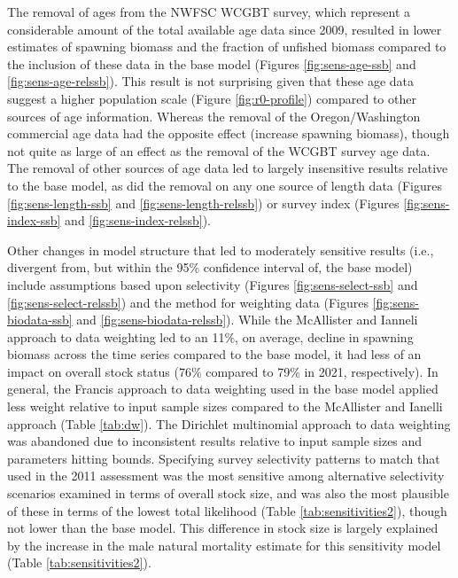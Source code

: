 \documentclass[11pt,
  english,
  a4paper,
]{article}
\begin{document}
\leavevmode\tagmcend\tagstructend\par


The removal of ages from the NWFSC WCGBT survey, which represent a considerable amount of the total available age data since 2009, resulted in lower estimates of spawning biomass and the fraction of unfished biomass compared to the inclusion of these data in the base model (Figures \ref{fig:sens-age-ssb} and \ref{fig:sens-age-relssb}). This result is not surprising given that these age data suggest a higher population scale (Figure \ref{fig:r0-profile}) compared to other sources of age information. Whereas the removal of the Oregon/Washington commercial age data had the opposite effect (increase spawning biomass), though not quite as large of an effect as the removal of the WCGBT survey age data. The removal of other sources of age data led to largely insensitive results relative to the base model, as did the removal on any one source of length data (Figures \ref{fig:sens-length-ssb} and \ref{fig:sens-length-relssb}) or survey index (Figures \ref{fig:sens-index-ssb} and \ref{fig:sens-index-relssb}).

\leavevmode\tagmcend\tagstructend\par


Other changes in model structure that led to moderately sensitive results (i.e., divergent from, but within the 95\% confidence interval of, the base model) include assumptions based upon selectivity (Figures \ref{fig:sens-select-ssb} and \ref{fig:sens-select-relssb}) and the method for weighting data (Figures \ref{fig:sens-biodata-ssb} and \ref{fig:sens-biodata-relssb}). While the McAllister and Ianneli approach to data weighting led to an 11\%, on average, decline in spawning biomass across the time series compared to the base model, it had less of an impact on overall stock status (76\% compared to 79\% in 2021, respectively). In general, the Francis approach to data weighting used in the base model applied less weight relative to input sample sizes compared to the McAllister and Ianelli approach (Table \ref{tab:dw}). The Dirichlet multinomial approach to data weighting was abandoned due to inconsistent results relative to input sample sizes and parameters hitting bounds. Specifying survey selectivity patterns to match that used in the 2011 assessment was the most sensitive among alternative selectivity scenarios examined in terms of overall stock size, and was also the most plausible of these in terms of the lowest total likelihood (Table \ref{tab:sensitivities2}), though not lower than the base model. This difference in stock size is largely explained by the increase in the male natural mortality estimate for this sensitivity model (Table \ref{tab:sensitivities2}).
\end{document}
